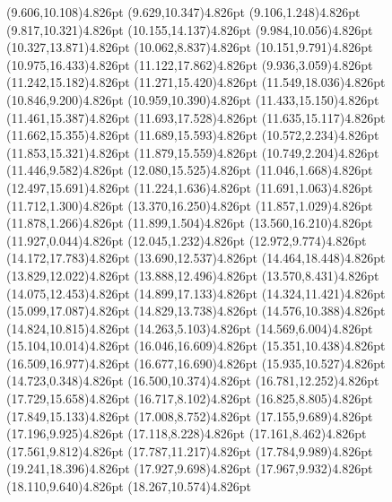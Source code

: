 \documentclass[10pt]{article}
\begin{document}
{{\qdisk(9.606,10.108){4.826pt}%
\qdisk(9.629,10.347){4.826pt}%
\qdisk(9.106,1.248){4.826pt}%
\qdisk(9.817,10.321){4.826pt}%
\qdisk(10.155,14.137){4.826pt}%
\qdisk(9.984,10.056){4.826pt}%
\qdisk(10.327,13.871){4.826pt}%
\qdisk(10.062,8.837){4.826pt}%
\qdisk(10.151,9.791){4.826pt}%
\qdisk(10.975,16.433){4.826pt}%
\qdisk(11.122,17.862){4.826pt}%
\qdisk(9.936,3.059){4.826pt}%
\qdisk(11.242,15.182){4.826pt}%
\qdisk(11.271,15.420){4.826pt}%
\qdisk(11.549,18.036){4.826pt}%
\qdisk(10.846,9.200){4.826pt}%
\qdisk(10.959,10.390){4.826pt}%
\qdisk(11.433,15.150){4.826pt}%
\qdisk(11.461,15.387){4.826pt}%
\qdisk(11.693,17.528){4.826pt}%
\qdisk(11.635,15.117){4.826pt}%
\qdisk(11.662,15.355){4.826pt}%
\qdisk(11.689,15.593){4.826pt}%
\qdisk(10.572,2.234){4.826pt}%
\qdisk(11.853,15.321){4.826pt}%
\qdisk(11.879,15.559){4.826pt}%
\qdisk(10.749,2.204){4.826pt}%
\qdisk(11.446,9.582){4.826pt}%
\qdisk(12.080,15.525){4.826pt}%
\qdisk(11.046,1.668){4.826pt}%
\qdisk(12.497,15.691){4.826pt}%
\qdisk(11.224,1.636){4.826pt}%
\qdisk(11.691,1.063){4.826pt}%
\qdisk(11.712,1.300){4.826pt}%
\qdisk(13.370,16.250){4.826pt}%
\qdisk(11.857,1.029){4.826pt}%
\qdisk(11.878,1.266){4.826pt}%
\qdisk(11.899,1.504){4.826pt}%
\qdisk(13.560,16.210){4.826pt}%
\qdisk(11.927,0.044){4.826pt}%
\qdisk(12.045,1.232){4.826pt}%
\qdisk(12.972,9.774){4.826pt}%
\qdisk(14.172,17.783){4.826pt}%
\qdisk(13.690,12.537){4.826pt}%
\qdisk(14.464,18.448){4.826pt}%
\qdisk(13.829,12.022){4.826pt}%
\qdisk(13.888,12.496){4.826pt}%
\qdisk(13.570,8.431){4.826pt}%
\qdisk(14.075,12.453){4.826pt}%
\qdisk(14.899,17.133){4.826pt}%
\qdisk(14.324,11.421){4.826pt}%
\qdisk(15.099,17.087){4.826pt}%
\qdisk(14.829,13.738){4.826pt}%
\qdisk(14.576,10.388){4.826pt}%
\qdisk(14.824,10.815){4.826pt}%
\qdisk(14.263,5.103){4.826pt}%
\qdisk(14.569,6.004){4.826pt}%
\qdisk(15.104,10.014){4.826pt}%
\qdisk(16.046,16.609){4.826pt}%
\qdisk(15.351,10.438){4.826pt}%
\qdisk(16.509,16.977){4.826pt}%
\qdisk(16.677,16.690){4.826pt}%
\qdisk(15.935,10.527){4.826pt}%
\qdisk(14.723,0.348){4.826pt}%
\qdisk(16.500,10.374){4.826pt}%
\qdisk(16.781,12.252){4.826pt}%
\qdisk(17.729,15.658){4.826pt}%
\qdisk(16.717,8.102){4.826pt}%
\qdisk(16.825,8.805){4.826pt}%
\qdisk(17.849,15.133){4.826pt}%
\qdisk(17.008,8.752){4.826pt}%
\qdisk(17.155,9.689){4.826pt}%
\qdisk(17.196,9.925){4.826pt}%
\qdisk(17.118,8.228){4.826pt}%
\qdisk(17.161,8.462){4.826pt}%
\qdisk(17.561,9.812){4.826pt}%
\qdisk(17.787,11.217){4.826pt}%
\qdisk(17.784,9.989){4.826pt}%
\qdisk(19.241,18.396){4.826pt}%
\qdisk(17.927,9.698){4.826pt}%
\qdisk(17.967,9.932){4.826pt}%
\qdisk(18.110,9.640){4.826pt}%
\qdisk(18.267,10.574){4.826pt}%
}}
\end{document}
